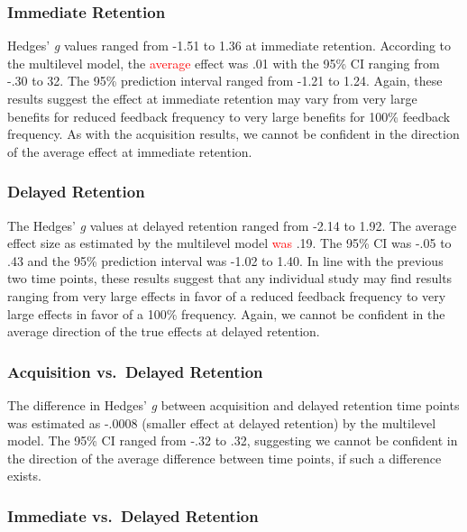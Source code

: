 \documentclass[
  english,
  man, donotrepeattitle,mask,floatsintext]{apa7}
\begin{document}
\hypertarget{immediate-retention}{%
\subsubsection{Immediate Retention}\label{immediate-retention}}

Hedges' \emph{g} values ranged from -1.51 to 1.36 at immediate retention. According to the multilevel model, the \textcolor{red}{average} effect was .01 with the 95\% CI ranging from -.30 to 32. The 95\% prediction interval ranged from -1.21 to 1.24. Again, these results suggest the effect at immediate retention may vary from very large benefits for reduced feedback frequency to very large benefits for 100\% feedback frequency. As with the acquisition results, we cannot be confident in the direction of the average effect at immediate retention.

\hypertarget{delayed-retention}{%
\subsubsection{Delayed Retention}\label{delayed-retention}}

The Hedges' \emph{g} values at delayed retention ranged from -2.14 to 1.92. The average effect size as estimated by the multilevel model \textcolor{red}{was} .19. The 95\% CI was -.05 to .43 and the 95\% prediction interval was -1.02 to 1.40. In line with the previous two time points, these results suggest that any individual study may find results ranging from very large effects in favor of a reduced feedback frequency to very large effects in favor of a 100\% frequency. Again, we cannot be confident in the average direction of the true effects at delayed retention.

\hypertarget{acquisition-vs.-delayed-retention}{%
\subsubsection{Acquisition vs.~Delayed Retention}\label{acquisition-vs.-delayed-retention}}

The difference in Hedges' \emph{g} between acquisition and delayed retention time points was estimated as -.0008 (smaller effect at delayed retention) by the multilevel model. The 95\% CI ranged from -.32 to .32, suggesting we cannot be confident in the direction of the average difference between time points, if such a difference exists.

\hypertarget{immediate-vs.-delayed-retention}{%
\subsubsection{Immediate vs.~Delayed Retention}\label{immediate-vs.-delayed-retention}}
\end{document}
